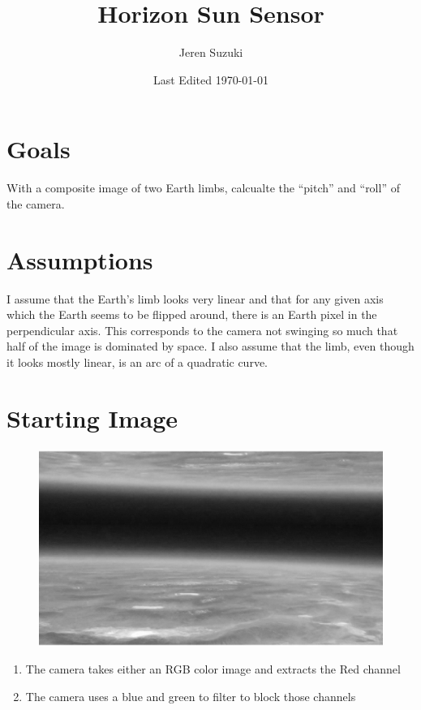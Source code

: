 \documentclass[10pt]{article}
\title{Horizon Sun Sensor}
\author{Jeren Suzuki}
\date{Last Edited \today}
\begin{document}
\maketitle
{}
\tableofcontents
\newpage
{}

\section{Goals}
With a composite image of two Earth limbs, calcualte the ``pitch'' and ``roll'' of the camera. 

\section{Assumptions} %
\label{sec:assumptions}
I assume that the Earth's limb looks very linear and that for any given axis which the Earth seems to be flipped around, there is an Earth pixel in the perpendicular axis. This corresponds to the camera not swinging so much that half of the image is dominated by space. I also assume that the limb, even though it looks mostly linear, is an arc of a quadratic curve. 


\section{Starting Image} %
\label{sec:starting_image}

\begin{figure}[!h]
    \centering
    \includegraphics[width=.9\textwidth]{plots_tables_images/raw.eps}    
    \label{raw}
\end{figure}

\begin{enumerate}
    \item The camera takes either an RGB color image and extracts the Red channel
    \item The camera uses a blue and green to filter to block those channels
\end{enumerate}
\end{document}
